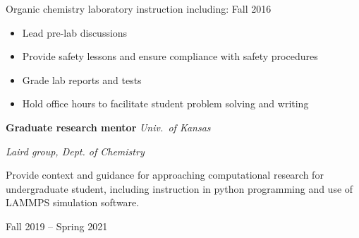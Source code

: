 \vspace{\y}
Organic chemistry laboratory instruction including: \hfill Fall 2016
\begin{itemize}[rightmargin=\dimexpr\linewidth-10cm-\leftmargin\relax,noitemsep,topsep=0cm]
\raggedright
  \item Lead pre-lab discussions
  \item Provide safety lessons and ensure compliance with safety procedures
  \item Grade lab reports and tests
  \item Hold office hours to facilitate student problem solving and writing
\end{itemize}

\vspace{\y}
{\bf Graduate research mentor} \hfill \textit{Univ.\ of Kansas}

\hfill \textit{Laird group, Dept. of Chemistry}

\begin{minipage}[t]{0.7\textwidth}
  Provide context and guidance for approaching computational research for undergraduate student, including instruction in python programming and use of LAMMPS simulation software.
\end{minipage}
\hfill Fall 2019 -- Spring 2021
